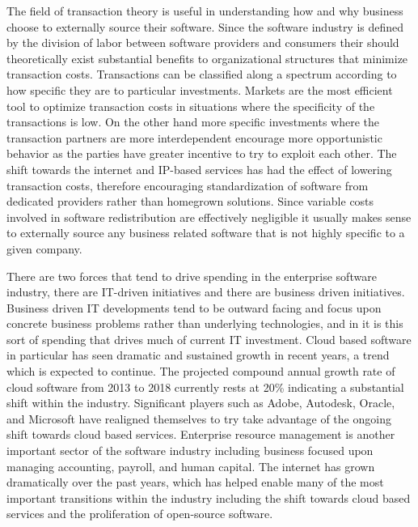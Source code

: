 The field of transaction theory is useful in understanding how and why business choose to externally source their software.
Since the software industry is defined by the division of labor between software providers and consumers their should theoretically exist substantial benefits to organizational structures that minimize transaction costs.\autocite[42]{buxmann2012software}
Transactions can be classified along a spectrum according to how specific they are to particular investments.
Markets are the most efficient tool to optimize transaction costs in situations where the specificity of the transactions is low.
On the other hand more specific investments where the transaction partners are more interdependent encourage more opportunistic behavior as the parties have greater incentive to try to exploit each other.\autocite[44]{buxmann2012software}
The shift towards the internet and IP-based services has had the effect of lowering transaction costs, therefore encouraging standardization of software from dedicated providers rather than homegrown solutions.\autocite[46]{buxmann2012software}
Since variable costs involved in software redistribution are effectively negligible it usually makes sense to externally source any business related software that is not highly specific to a given company.

There are two forces that tend to drive spending in the enterprise software industry, there are IT-driven initiatives and there are business driven initiatives.\autocite[]{NextGenBusinessSoftware}
Business driven IT developments tend to be outward facing and focus upon concrete business problems rather than underlying technologies, and in it is this sort of spending that drives much of current IT investment.\autocite[]{NextGenBusinessSoftware}
Cloud based software in particular has seen dramatic and sustained growth in recent years, a trend which is expected to continue.
The projected compound annual growth rate of cloud software from 2013 to 2018 currently rests at 20\% indicating a substantial shift within the industry. Significant players such as Adobe, Autodesk, Oracle, and Microsoft have realigned themselves to try take advantage of the ongoing shift towards cloud based services.\autocite[40]{SurveysSoftware2015}
Enterprise resource management is another important sector of the software industry including business focused upon managing accounting, payroll, and human capital.\autocite[46]{SurveysSoftware2015}
The internet has grown dramatically over the past years, which has helped enable many of the most important transitions within the industry including the shift towards cloud based services and the proliferation of open-source software.\autocite[]{SurveysSoftware2015}
